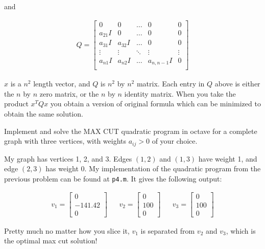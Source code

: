 \documentclass[fleqn]{homework}
\begin{document}
\begin{problem}{3}
\begin{enumerate}[a.]
      and

      \begin{align*}
        Q = \begin{bmatrix*} 
          0 & 0 & \dots & 0 & 0 \\
          a_{21} I & 0 & \dots & 0 & 0 \\
          a_{31} I & a_{32} I & \dots & 0 & 0 \\
          \vdots & \vdots & \ddots & \vdots & \vdots \\
          a_{n1} I & a_{n2} I & \dots & a_{n,n-1} I & 0 \\
        \end{bmatrix*}
      \end{align*}

      $x$ is a $n^2$ length vector, and $Q$ is $n^2$ by $n^2$ matrix.  Each
      entry in $Q$ above is either the $n$ by $n$ zero matrix, or the $n$ by $n$
      identity matrix.  When you take the product $x^T Q x$ you obtain a version
      of original formula which can be minimized to obtain the same solution.
    \end{enumerate}
  \end{problem}

  \begin{problem}{4}
    \begin{question}
      Implement and solve the MAX CUT quadratic program in octave for a complete
      graph with three vertices, with weights $a_{ij} > 0$ of your choice.
    \end{question}

    My graph has vertices 1, 2, and 3.  Edges $(1,2)$ and $(1,3)$ have weight 1,
    and edge $(2, 3)$ has weight 0.  My implementation of the quadratic program
    from the previous problem can be found at \texttt{p4.m}.  It gives the
    following output:

    \begin{align*}
      v_1 = \begin{bmatrix*} 0 \\ -141.42 \\ 0 \end{bmatrix*} &&
      v_2 = \begin{bmatrix*} 0 \\ 100 \\ 0 \end{bmatrix*} &&
      v_3 = \begin{bmatrix*} 0 \\ 100 \\ 0 \end{bmatrix*}
    \end{align*}

    Pretty much no matter how you slice it, $v_1$ is separated from $v_2$ and
    $v_3$, which is the optimal max cut solution!
  \end{problem}
\end{document}
